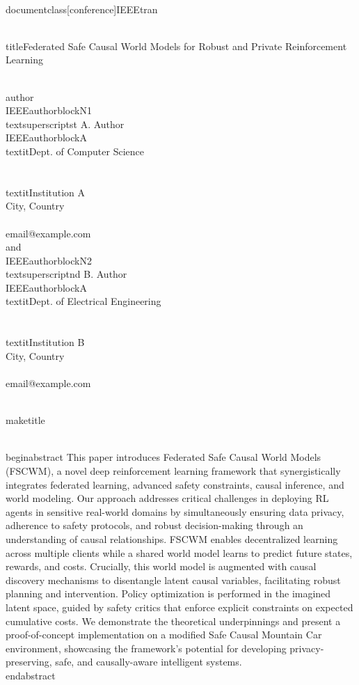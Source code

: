 \\documentclass[conference]{IEEEtran}
\begin{document}
\\title{Federated Safe Causal World Models for Robust and Private Reinforcement Learning}

\\author{\\IEEEauthorblockN{1\\textsuperscript{st} A. Author}
\\IEEEauthorblockA{\\textit{Dept. of Computer Science} \\\\
\\textit{Institution A}\\
City, Country \\\\
email@example.com}
\\and
\\IEEEauthorblockN{2\\textsuperscript{nd} B. Author}
\\IEEEauthorblockA{\\textit{Dept. of Electrical Engineering} \\\\
\\textit{Institution B}\\
City, Country \\\\
email@example.com}
}

\\maketitle

\\begin{abstract}
This paper introduces Federated Safe Causal World Models (FSCWM), a novel deep reinforcement learning framework that synergistically integrates federated learning, advanced safety constraints, causal inference, and world modeling. Our approach addresses critical challenges in deploying RL agents in sensitive real-world domains by simultaneously ensuring data privacy, adherence to safety protocols, and robust decision-making through an understanding of causal relationships. FSCWM enables decentralized learning across multiple clients while a shared world model learns to predict future states, rewards, and costs. Crucially, this world model is augmented with causal discovery mechanisms to disentangle latent causal variables, facilitating robust planning and intervention. Policy optimization is performed in the imagined latent space, guided by safety critics that enforce explicit constraints on expected cumulative costs. We demonstrate the theoretical underpinnings and present a proof-of-concept implementation on a modified Safe Causal Mountain Car environment, showcasing the framework's potential for developing privacy-preserving, safe, and causally-aware intelligent systems.
\\end{abstract}
\end{document}
